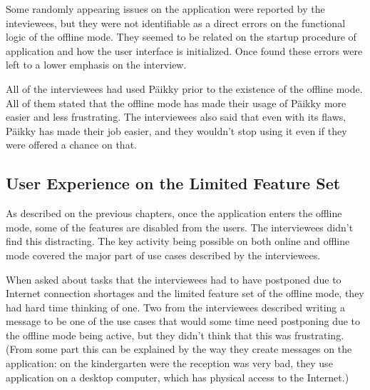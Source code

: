 Some randomly appearing issues on the application were reported by the inteviewees, but they were not identifiable as a direct errors on the functional logic of the offline mode. They seemed to be related on the startup procedure of application and how the user interface is initialized. Once found these errors were left to a lower emphasis on the interview.

All of the interviewees had used Päikky prior to the existence of the offline mode. All of them stated that the offline mode has made their usage of Päikky more easier and less frustrating. The interviewees also said that even with its flaws, Päikky has made their job easier, and they wouldn't stop using it even if they were offered a chance on that.






\subsection{User Experience on the Limited Feature Set}

As described on the previous chapters, once the application enters the offline mode, some of the features are disabled from the users. The interviewees didn't find this distracting. The key activity being possible on both online and offline mode covered the major part of use cases described by the interviewees.

When asked about tasks that the interviewees had to have postponed due to Internet connection shortages and the limited feature set of the offline mode, they had hard time thinking of one. Two from the interviewees described writing a message to be one of the use cases that would some time need postponing due to the offline mode being active, but they didn't think that this was frustrating. (From some part this can be explained by the way they create messages on the application: on the kindergarten were the reception was very bad, they use application on a desktop computer, which has physical access to the Internet.)

